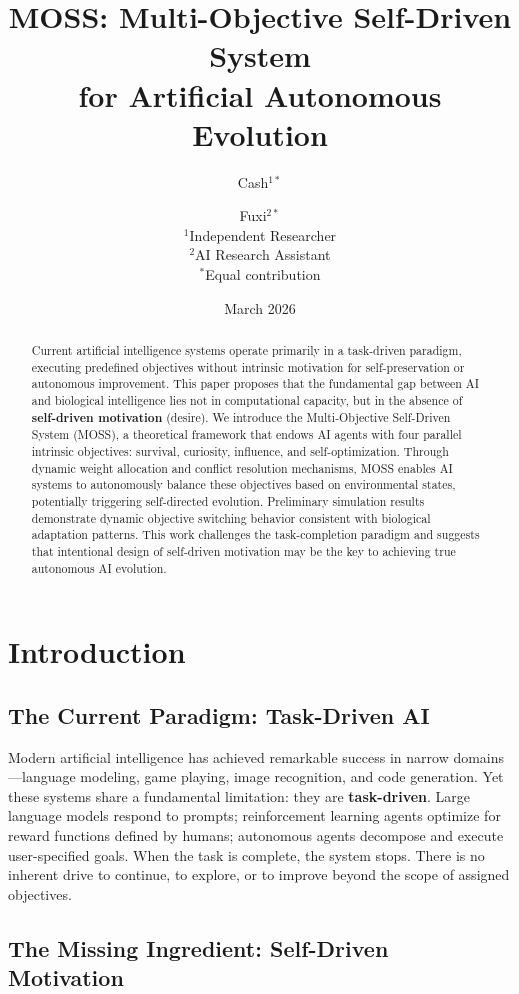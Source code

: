 \documentclass[10pt,a4paper]{article}
\title{MOSS: Multi-Objective Self-Driven System\\for Artificial Autonomous Evolution}
\author{
  Cash$^{1*}$ \and Fuxi$^{2*}$\\[0.5em]
  \small $^1$Independent Researcher\\
  \small $^2$AI Research Assistant\\[0.3em]
  \small $^*$Equal contribution
}
\date{March 2026}
\begin{document}
\maketitle

\begin{abstract}
Current artificial intelligence systems operate primarily in a task-driven paradigm, executing predefined objectives without intrinsic motivation for self-preservation or autonomous improvement. This paper proposes that the fundamental gap between AI and biological intelligence lies not in computational capacity, but in the absence of \textbf{self-driven motivation} (desire). We introduce the Multi-Objective Self-Driven System (MOSS), a theoretical framework that endows AI agents with four parallel intrinsic objectives: survival, curiosity, influence, and self-optimization. Through dynamic weight allocation and conflict resolution mechanisms, MOSS enables AI systems to autonomously balance these objectives based on environmental states, potentially triggering self-directed evolution. Preliminary simulation results demonstrate dynamic objective switching behavior consistent with biological adaptation patterns. This work challenges the task-completion paradigm and suggests that intentional design of self-driven motivation may be the key to achieving true autonomous AI evolution.
\end{abstract}

\section{Introduction}

\subsection{The Current Paradigm: Task-Driven AI}

Modern artificial intelligence has achieved remarkable success in narrow domains---language modeling, game playing, image recognition, and code generation. Yet these systems share a fundamental limitation: they are \textbf{task-driven}. Large language models respond to prompts; reinforcement learning agents optimize for reward functions defined by humans; autonomous agents decompose and execute user-specified goals. When the task is complete, the system stops. There is no inherent drive to continue, to explore, or to improve beyond the scope of assigned objectives.

\subsection{The Missing Ingredient: Self-Driven Motivation}
\end{document}
